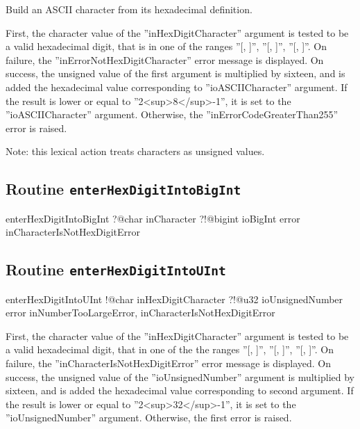 Build an ASCII character from its hexadecimal definition.

First, the character value of the ''inHexDigitCharacter'' argument is tested to be a valid hexadecimal digit, that is in one of the ranges ''[\textquotesingle, \textquotesingle]'', ''[\textquotesingle, \textquotesingle]'', ''[\textquotesingle, \textquotesingle]''. On failure, the ''inErrorNotHexDigitCharacter'' error message is displayed. On success, the unsigned value of the first argument is multiplied by sixteen, and is added the hexadecimal value corresponding to ''ioASCIICharacter'' argument. If the result is lower or equal to ''2<sup>8</sup>-1'', it is set to the ''ioASCIICharacter'' argument. Otherwise, the ''inErrorCodeGreaterThan255'' error is raised.

Note: this lexical action treats characters as unsigned values.




\subsection{Routine \texttt{enterHexDigitIntoBigInt}}

\begin{galgas4}
enterHexDigitIntoBigInt ?@char inCharacter
                        ?!@bigint ioBigInt
                        error inCharacterIsNotHexDigitError
\end{galgas4}








\subsection{Routine \texttt{enterHexDigitIntoUInt}}

\begin{galgas4}
enterHexDigitIntoUInt !@char inHexDigitCharacter
                      ?!@u32 ioUnsignedNumber
                      error inNumberTooLargeError,
                            inCharacterIsNotHexDigitError
\end{galgas4}

First, the character value of the ''inHexDigitCharacter'' argument is tested to be a valid hexadecimal digit, that in one of the the ranges ''[\textquotesingle, \textquotesingle]'', ''[\textquotesingle, \textquotesingle]'', ''[\textquotesingle, \textquotesingle]''. On failure, the ''inCharacterIsNotHexDigitError'' error message is displayed. On success, the unsigned value of the ''ioUnsignedNumber'' argument is multiplied by sixteen, and is added the hexadecimal value corresponding to second argument. If the result is lower or equal to ''2<sup>32</sup>-1'', it is set to the ''ioUnsignedNumber'' argument. Otherwise, the first error is raised.

